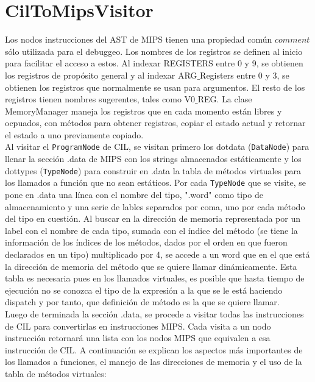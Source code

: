 \documentclass[a4paper,12pt]{article}
\def\code#1{\texttt{#1}}
\begin{document}
\section*{CilToMipsVisitor}
Los nodos instrucciones del AST de MIPS tienen una propiedad común $comment$ sólo utilizada para el debuggeo. Los nombres de los registros se definen al inicio para facilitar el acceso a estos. Al indexar REGISTERS entre 0 y 9, se obtienen los registros de propósito general y al indexar ARG$\_$Registers entre 0 y 3, se obtienen los registros que normalmente se usan para argumentos. El resto de los registros tienen nombres sugerentes, tales como V0$\_$REG. La clase MemoryManager maneja los registros que en cada momento están libres y ocpuados, con métodos para obtener registros, copiar el estado actual y retornar el estado a uno previamente copiado.\\
Al visitar el \code{ProgramNode} de CIL, se visitan primero los dotdata (\code{DataNode}) para llenar la sección .data de MIPS con los strings almacenados estáticamente y los dottypes (\code{TypeNode}) para construir en .data la tabla de métodos virtuales para los llamados a función que no sean estáticos. Por cada \code{TypeNode} que se visite, se pone en .data una línea con el nombre del tipo, ".word" como tipo de almacenamiento y una serie de lables separados por coma, uno por cada método del tipo en cuestión. Al buscar en la dirección de memoria representada por un label con el nombre de cada tipo, sumada con el índice del método (se tiene la información de los índices de los métodos, dados por el orden en que fueron declarados en un tipo) multiplicado por 4, se accede a un word que en el que está la dirección de memoria del método que se quiere llamar dinámicamente. Esta tabla es necesaria pues en los llamados virtuales, es posible que hasta tiempo de ejecución no se conozca el tipo de la expresión a la que se le está haciendo dispatch y por tanto, que definición de método es la que se quiere llamar.\\
Luego de terminada la sección .data, se procede a visitar todas las instrucciones de CIL para convertirlas en instrucciones MIPS. Cada visita a un nodo instrucción retornará una lista con los nodos MIPS que equivalen a esa instrucción de CIL. A continuación se explican los aspectos más importantes de los llamados a funciones, el manejo de las direcciones de memoria y el uso de la tabla de métodos virtuales:\\
\end{document}
